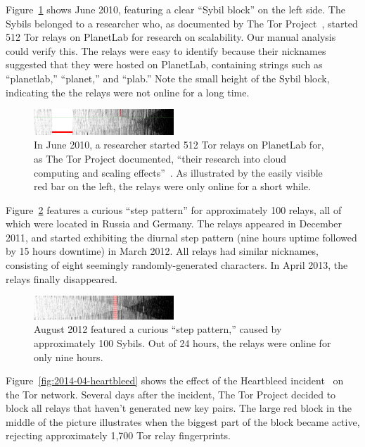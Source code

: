 Figure~\ref{fig:2010-06-planetlab} shows June 2010, featuring a clear ``Sybil
block'' on the left side.  The Sybils belonged to a researcher who, as
documented by The Tor Project~\cite{progressreport}, started 512 Tor relays on
PlanetLab for research on scalability.  Our manual analysis could verify this.
The relays were easy to identify because their nicknames suggested that they
were hosted on PlanetLab, containing strings such as ``planetlab,'' ``planet,''
and ``plab.''  Note the small height of the Sybil block, indicating the the
relays were not online for a long time.

\begin{figure}[t]
	\centering
	\includegraphics[width=0.47\textwidth]{diagrams/planetlab-uptimes.jpg}
	\caption{In June 2010, a researcher started 512 Tor relays on PlanetLab for,
		as The Tor Project documented, ``their research into cloud computing and
		scaling effects''~\cite{progressreport}.  As illustrated by the easily
		visible red bar on the left, the relays were only online for a short
		while.}
	\label{fig:2010-06-planetlab}
\end{figure}

Figure~\ref{fig:2012-08-steppattern} features a curious ``step pattern'' for
approximately 100 relays, all of which were located in Russia and Germany.  The
relays appeared in December 2011, and started exhibiting the diurnal step
pattern (nine hours uptime followed by 15 hours downtime) in March 2012.  All
relays had similar nicknames, consisting of eight seemingly randomly-generated
characters.  In April 2013, the relays finally disappeared.

\begin{figure}[t]
	\centering
	\includegraphics[width=0.47\textwidth]{diagrams/2012-08.jpg}
	\caption{August 2012 featured a curious ``step pattern,'' caused by
	approximately 100 Sybils.  Out of 24 hours, the relays were online for only
	nine hours.}
	\label{fig:2012-08-steppattern}
\end{figure}

Figure~\ref{fig:2014-04-heartbleed} shows the effect of the Heartbleed
incident~\cite{Durumeric2014a} on the Tor network.  Several days after the
incident, The Tor Project decided to block all relays that haven't generated new
key pairs.  The large red block in the middle of the picture illustrates when
the biggest part of the block became active, rejecting approximately 1,700 Tor
relay fingerprints.

